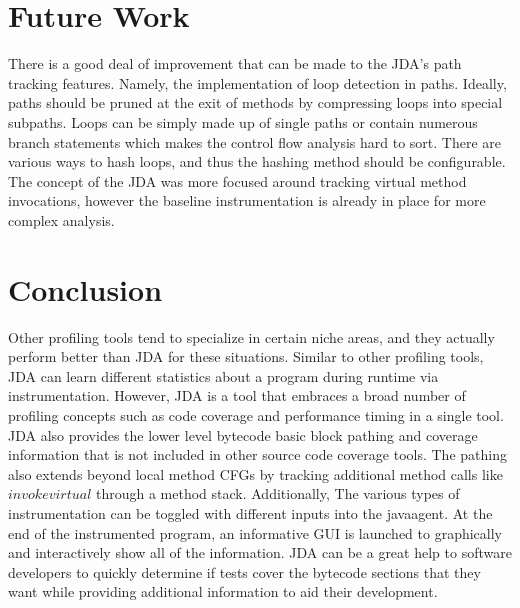 \documentclass[conference,10pt,twocolumn]{./IEEE/IEEEtran}
\begin{document}
\section{Future Work}
There is a good deal of improvement that can be made to the JDA’s path tracking features.
Namely, the implementation of loop detection in paths.  
Ideally, paths should be pruned at the exit of methods by compressing loops into special subpaths.  
Loops can be simply made up of single paths or contain numerous branch statements which makes the control flow analysis hard to sort.  
There are various ways to hash loops, and thus the hashing method should be configurable.  
The concept of the JDA was more focused around tracking virtual method invocations, however the baseline instrumentation is already in place for more complex analysis.

\section{Conclusion}
Other profiling tools tend to specialize in certain niche areas, and they actually perform better than JDA for these situations.
Similar to other profiling tools, JDA can learn different statistics about a program during runtime via instrumentation.
However, JDA is a tool that embraces a broad number of profiling concepts such as code coverage and performance timing in a single tool.
JDA also provides the lower level bytecode basic block pathing and coverage information that is not included in other source code coverage tools.
The pathing also extends beyond local method CFGs by tracking additional method calls like $invokevirtual$ through a method stack.
Additionally, The various types of instrumentation can be toggled with different inputs into the javaagent.
At the end of the instrumented program, an informative GUI is launched to graphically and interactively show all of the information.
JDA can be a great help to software developers to quickly determine if tests cover the bytecode sections that they want while providing additional information to aid their development.



\end{document}
